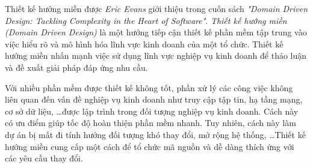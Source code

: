 Thiết kế hướng miền được \emph{Eric Evans} giới thiệu trong cuốn sách \emph{"Domain Driven Design: Tackling Complexity in the Heart of Software"}. \emph{Thiết kế hướng miền (Domain Driven Design)} là một hướng tiếp cận thiết kế phần mềm tập trung vào việc hiểu rõ và mô hình hóa lĩnh vực kinh doanh của một tổ chức. Thiết kế hướng miền nhấn mạnh việc sử dụng lĩnh vực nghiệp vụ kinh doanh để thảo luận và đề xuất giải pháp đáp ứng nhu cầu.

Với nhiều phần mềm được thiết kế không tốt, phần xử lý các công việc không liên quan đến vấn đề nghiệp vụ kinh doanh như truy cập tập tin, hạ tầng mạng, cơ sở dữ liệu, \dots được lập trình trong đối tượng nghiệp vụ kinh doanh. Cách này có ưu điểm giúp tốc độ hoàn thiện phần mềm nhanh. Tuy nhiên, cách này làm dự án bị mất đi tính hướng đối tượng khó thay đổi, mở rộng hệ thống, \dots Thiết kế hướng miền cung cấp một cách để tổ chức mã nguồn và dễ dàng thích ứng với các yêu cầu thay đổi.















